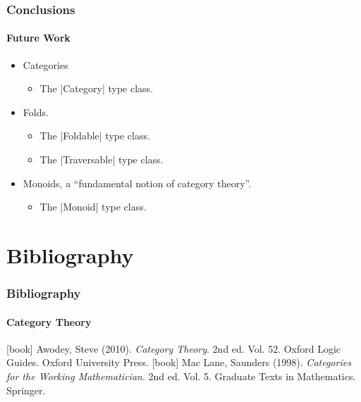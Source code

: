 \documentclass{beamer}
\begin{document}
\begin{frame}[fragile]
  \frametitle{Conclusions}
  \framesubtitle{Future Work}

  \begin{itemize}
  \item
    Categories
    \begin{itemize}
    \item
      The |Category| type class.
    \end{itemize}
  \end{itemize}
  \begin{itemize}
  \item
    Folds.
    \begin{itemize}
    \item
      The |Foldable| type class.
    \item
      The |Traversable| type class.
    \end{itemize}
  \end{itemize}
  \begin{itemize}
  \item
    Monoids, a ``fundamental notion of category theory''.
    \begin{itemize}
    \item
      The |Monoid| type class.
    \end{itemize}
  \end{itemize}

\end{frame}


\section*{Bibliography}


\begin{frame}
  \frametitle{Bibliography}
  \framesubtitle{Category Theory}

  \begin{thebibliography}{Mac Lane 1998}
  [book]
    Awodey, Steve (2010).
    \newblock \emph{Category Theory}.
    \newblock 2nd ed. Vol. 52. Oxford Logic Guides.
    \newblock Oxford University Press.
  [book]
    Mac Lane, Saunders (1998).
    \newblock \emph{Categories for the Working Mathematician}.
    \newblock 2nd ed. Vol. 5. Graduate Texts in Mathematics.
    \newblock Springer.
  \end{thebibliography}

\end{frame}
\end{document}

